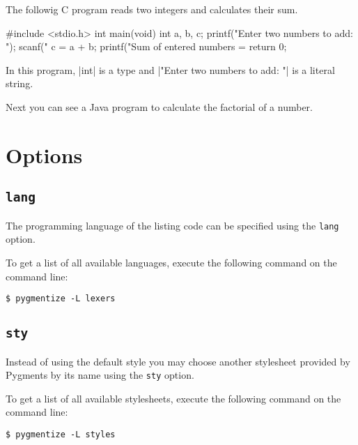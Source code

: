 \documentclass[10pt,a4paper]{article}
\begin{document}
The followig C program reads two integers and calculates their sum.

\begin{Example}
\begin{pygmented}[lang=c]
#include <stdio.h>
int main(void)
{
   int a, b, c;
   printf("Enter two numbers to add: ");
   scanf("%
   c = a + b;
   printf("Sum of entered numbers = %
   return 0;
}
\end{pygmented}
\end{Example}

\begin{Example}
  In this program, \pyginline[lang=c]|int| is a type and
  \pyginline[lang=c]|"Enter two numbers to add: "| is a literal string.
\end{Example}

Next you can see a Java program to calculate the factorial of a number.

\begin{Example}
\end{Example}

\section{Options}
\subsection{\texttt{lang}}
The programming language of the listing code can be specified using the
\verb|lang| option.

To get a list of all available languages, execute the following command
on the command line:
\begin{verbatim}
$ pygmentize -L lexers
\end{verbatim}

\subsection{\texttt{sty}}

Instead of using the default style you may choose another stylesheet
provided by Pygments by its name using the \verb|sty| option.

To get a list of all available stylesheets, execute the following
command on the command line:
\begin{verbatim}
$ pygmentize -L styles
\end{verbatim}
\end{document}
